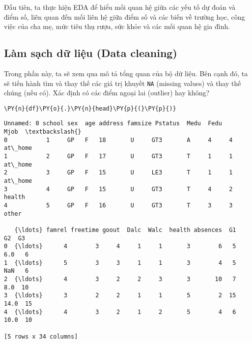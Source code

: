 Đầu tiên, ta thực hiện EDA để hiểu mối quan hệ giữa các yếu tố dự đoán
và điểm số, liên quan đến mối liên hệ giữa điểm số và các biến về trường
học, công việc của cha mẹ, mức tiêu thụ rượu, sức khỏe và các mối quan
hệ gia đình.

    \hypertarget{luxe0m-sux1ea1ch-dux1eef-liux1ec7u-data-cleaning}{%
\subsection{Làm sạch dữ liệu (Data
cleaning)}\label{luxe0m-sux1ea1ch-dux1eef-liux1ec7u-data-cleaning}}

    Trong phần này, ta sẽ xem qua mô tả tổng quan của bộ dữ liệu. Bên cạnh
đó, ta sẽ tiến hành tìm và thay thế các giá trị khuyết \texttt{NA}
(missing values) và thay thế chúng (nếu có). Xác định có các điểm ngoại
lai (outlier) hay không?

    \begin{tcolorbox}[breakable, size=fbox, boxrule=1pt, pad at break*=1mm,colback=cellbackground, colframe=cellborder]
\begin{Verbatim}[commandchars=\\\{\}]
\PY{n}{df}\PY{o}{.}\PY{n}{head}\PY{p}{(}\PY{p}{)}
\end{Verbatim}
\end{tcolorbox}

            \begin{tcolorbox}[breakable, size=fbox, boxrule=.5pt, pad at break*=1mm, opacityfill=0]
\begin{Verbatim}[commandchars=\\\{\}]
   Unnamed: 0 school sex  age address famsize Pstatus  Medu  Fedu     Mjob  \textbackslash{}
0           1     GP   F   18       U     GT3       A     4     4  at\_home
1           2     GP   F   17       U     GT3       T     1     1  at\_home
2           3     GP   F   15       U     LE3       T     1     1  at\_home
3           4     GP   F   15       U     GT3       T     4     2   health
4           5     GP   F   16       U     GT3       T     3     3    other

   {\ldots} famrel freetime goout  Dalc  Walc  health absences  G1    G2  G3
0  {\ldots}      4        3     4     1     1       3        6   5   6.0   6
1  {\ldots}      5        3     3     1     1       3        4   5   NaN   6
2  {\ldots}      4        3     2     2     3       3       10   7   8.0  10
3  {\ldots}      3        2     2     1     1       5        2  15  14.0  15
4  {\ldots}      4        3     2     1     2       5        4   6  10.0  10

[5 rows x 34 columns]
\end{Verbatim}
\end{tcolorbox}
        
